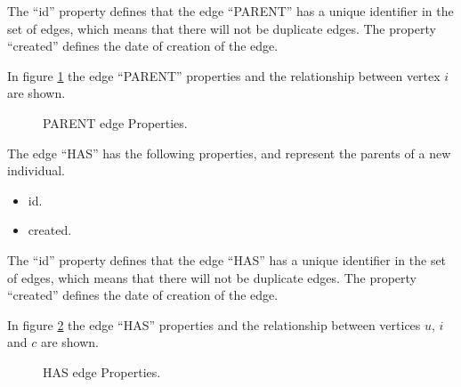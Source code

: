 \documentclass[conference]{IEEEtran}
\begin{document}
The “id” property defines that the edge “PARENT” has a unique identifier in the set of edges, which means that there will not be duplicate edges.
The property “created” defines the date of creation of the edge.

In figure \ref{fig:Parent_edge} the edge “PARENT” properties and the relationship between vertex $i$ are shown.

\begin{figure}
\captionsetup{justification=centering,margin=2cm}
\centering
\setlength\fboxsep{0pt}
\setlength\fboxrule{0.7pt}
\caption{PARENT edge Properties.}
\label{fig:Parent_edge}       
\end{figure}

The edge “HAS” has the following properties, and represent the parents of a new individual.
\begin{itemize} 
\item id. 
\item created. 
\end{itemize}

The “id” property defines that the edge “HAS” has a unique identifier in the set of edges, which means that there will not be duplicate edges.
The property “created” defines the date of creation of the edge.

In figure \ref{fig:Has_edge} the edge “HAS” properties and the relationship between vertices $u$, $i$ and $c$ are shown.

\begin{figure}
\captionsetup{justification=centering,margin=2cm}
\centering
\setlength\fboxsep{0pt}
\setlength\fboxrule{0.7pt}
\caption{HAS edge Properties.}
\label{fig:Has_edge}       
\end{figure}
\end{document}
